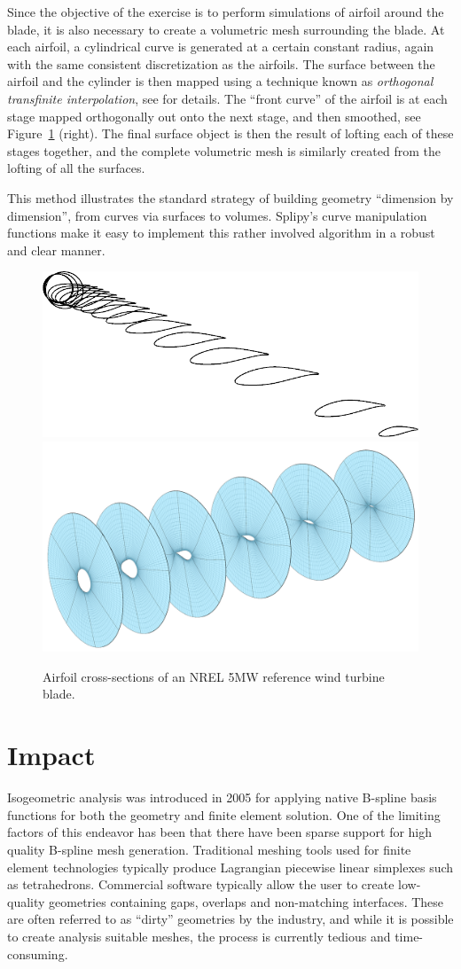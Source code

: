 \documentclass[preprint,12pt, a4paper]{elsarticle}
\begin{document}
Since the objective of the exercise is to perform simulations of airfoil around the blade, it is also necessary to create a volumetric mesh surrounding the blade.
At each airfoil, a cylindrical curve is generated at a certain constant radius, again with the same consistent discretization as the airfoils.
The surface between the airfoil and the cylinder is then mapped using a technique known as \emph{orthogonal transfinite interpolation}, see \cite{Fonn2015sbm} for details.
The ``front curve'' of the airfoil is at each stage mapped orthogonally out onto the next stage, and then smoothed, see Figure~\ref{fig:airfoils} (right).
The final surface object is then the result of lofting each of these stages together, and the complete volumetric mesh is similarly created from the lofting of all the surfaces.

This method illustrates the standard strategy of building geometry ``dimension by dimension'', from curves via surfaces to volumes.
Splipy's curve manipulation functions make it easy to implement this rather involved algorithm in a robust and clear manner.

\begin{figure}
  \begin{center}
    \includegraphics[width=.4\textwidth]{figs/airfoils}
    \includegraphics[width=.5\textwidth]{figs/crossecs2}
  \end{center}
  \caption{Airfoil cross-sections of an NREL 5MW reference wind turbine blade.}
  \label{fig:airfoils}
\end{figure}

\section{Impact}
\label{sec:impact}

Isogeometric analysis was introduced in 2005 \cite{hughes2005iac} for applying native B-spline basis functions for both the geometry and finite element solution.
One of the limiting factors of this endeavor has been that there have been sparse support for high quality B-spline mesh generation.
Traditional meshing tools used for finite element technologies typically produce Lagrangian piecewise linear simplexes such as tetrahedrons.
Commercial software typically allow the user to create low-quality geometries containing gaps, overlaps and non-matching interfaces.
These are often referred to as ``dirty'' geometries by the industry, and while it is possible to create analysis suitable meshes, the process is currently tedious and time-consuming.
\end{document}
